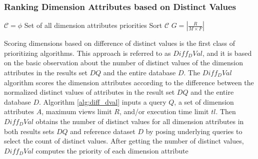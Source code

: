 \subsubsection{Ranking Dimension Attributes based on Distinct Values} 
%
\begin{algorithm}[t]                      
\caption{$Diff_DVal$}          
\label{alg:diff_dval}                                         
$\mathcal{C} = \phi$ Set of all dimension attributes priorities \;
	Sort $\mathcal{C}$\;
	$G= |\frac{R}{M \times F}|$ \;
		\;
\end{algorithm}
%
%
%
Scoring dimensions based on difference of distinct values is the first class of prioritizing algorithms.
%
This approach is referred to as $Diff_DVal$, and it is based on the basic observation 
about the number of distinct values of the dimension attributes in 
the results set $DQ$ and the entire database $D$. 
%
The $Diff_DVal$ algorithm scores the dimension attributes according
to the difference between the normalized distinct values of attributes in the 
result set $DQ$ and the entire database $D$. 
%
Algorithm \ref{alg:diff_dval} inputs a query $Q$, a set
of dimension attributes $A$, maximum views limit $R$, and/or execution time limit $tl$. 
%
Then $Diff_DVal$ obtains the number
of distinct values for all dimension attributes in both results sets $DQ$ and reference dataset $D$ by posing underlying queries to select the count of distinct values. 
%
After getting the number of distinct values, $Diff_DVal$ computes the priority of each dimension attribute 
